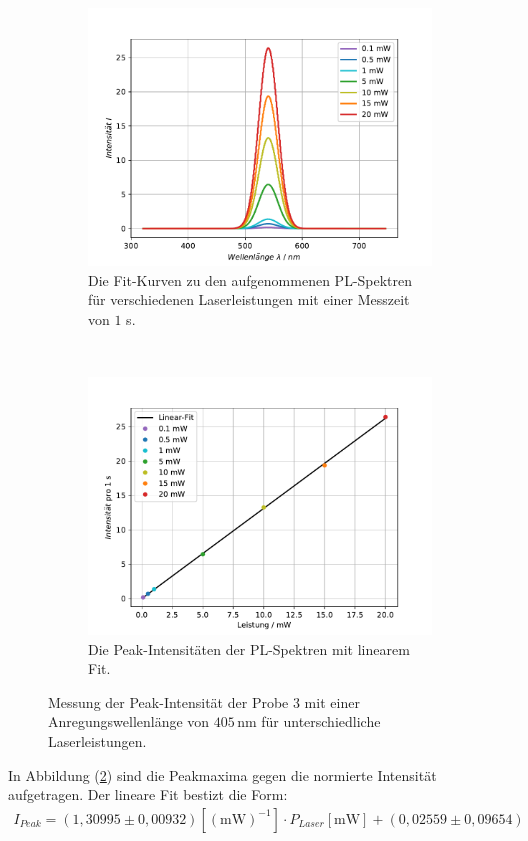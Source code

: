 \begin{figure}[H]
\centering
	\begin{subfigure}[t]{0.45\textwidth}
	\includegraphics[width=\textwidth]{Plots/aufgabe1c2_1s.pdf}
	\caption{Die Fit-Kurven zu den aufgenommenen PL-Spektren f\"{u}r verschiedenen Laserleistungen mit einer Messzeit von $1$ s.}
	\label{abb:verLeistung2}
	\end{subfigure}
	~
	\begin{subfigure}[t]{0.45\textwidth}
	\includegraphics[width=\textwidth]{Plots/aufgabe1c3.pdf}
	\caption{Die Peak-Intensit\"{a}ten der PL-Spektren mit linearem Fit.}
	\label{abb:Leistungen_fit}
	\end{subfigure}
\caption{Messung der Peak-Intensit\"{a}t der Probe 3 mit einer Anregungswellenl\"{a}nge von $405 \,$nm f\"{u}r unterschiedliche Laserleistungen.}
\label{abb:auf1c}
\end{figure}
In Abbildung (\ref{abb:Leistungen_fit}) sind die Peakmaxima gegen die normierte Intensit\"{a}t aufgetragen.
Der lineare Fit bestizt die Form:
\begin{align}
	I_{Peak} = (1,30995 \pm 0,00932)[(\text{mW})^{-1}] \cdot P_{Laser}[\text{mW}] + (0,02559 \pm 0,09654)
	\label{eq:fit1}
\end{align}


